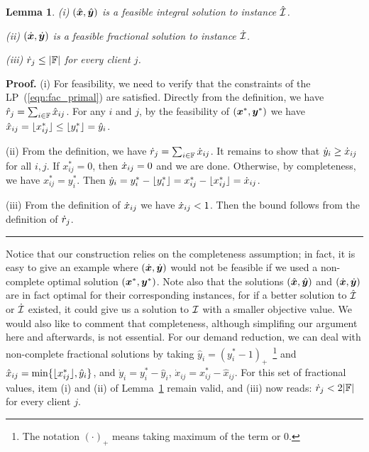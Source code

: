 \documentclass[oneside,final]{ucr}
\newtheorem{lemma}[theorem]{Lemma}
\newenvironment{proof}[1][Proof]{\textbf{#1.} }{\ \rule{0.5em}{0.5em}}
\begin{document}

\begin{lemma}\label{lem: polynomial demands partition}
{\rm (i)}
  $(\hat{\boldsymbol{x}}, \hat{\boldsymbol{y}})$ is a feasible integral solution to
  instance $\hatcalI$.

\noindent
{\rm (ii)}
  $(\dot{\boldsymbol{x}}, \dot{\boldsymbol{y}})$ is a feasible fractional
  solution to instance $\dotcalI$.

\noindent
{\rm (iii)}
${\dot r}_j\leq |\mathbb{F}|$ for every client $j$.

\end{lemma}
\begin{proof}
  (i) For feasibility, we need to verify that the
  constraints of the LP~(\ref{eqn:fac_primal}) are
  satisfied. Directly from the definition, we have ${\hat r}_j
  = \sum_{i\in\mathbb{F}} {\hat x}_{ij}$.  For any $i$ and $j$,
  by the feasibility of $(\boldsymbol{x}^\ast,\boldsymbol{y}^\ast)$ we have
  ${\hat x}_{ij} = { \lfloor x_{ij}^\ast \rfloor } \le { \lfloor y^\ast_i \rfloor } =
  {\hat y}_i$.

  (ii) From the definition, we have ${\dot r}_j =
  \sum_{i\in\mathbb{F}} {\dot x}_{ij}$.  It remains to show that
  ${\dot y}_i \geq {\dot x}_{ij}$ for all $i,j$.  If
  $x_{ij}^\ast=0$, then ${\dot x}_{ij}=0$ and we are done.
  Otherwise, by completeness, we have
  $x_{ij}^\ast=y_i^\ast$.  Then ${\dot y}_i = y_i^\ast -
  { \lfloor y_i^\ast \rfloor } = x_{ij}^\ast - { \lfloor x_{ij}^\ast \rfloor }
  ={\dot x}_{ij}$.

  (iii) From the definition of ${\dot x}_{ij}$ we have
  ${\dot x}_{ij} < 1$.  Then the bound follows from the
  definition of ${\dot r}_j$.
\end{proof}

Notice that our construction relies on the completeness
assumption; in fact, it is easy to give an example where
$(\dot{\boldsymbol{x}}, \dot{\boldsymbol{y}})$ would not be feasible if we used a
non-complete optimal solution $(\boldsymbol{x}^\ast,\boldsymbol{y}^\ast)$.  Note
also that the solutions $(\hat{\boldsymbol{x}},\hat{\boldsymbol{y}})$ and $(\dot{\boldsymbol{x}},
\dot{\boldsymbol{y}})$ are in fact optimal for their corresponding
instances, for if a better solution to $\hatcalI$ or
$\dotcalI$ existed, it could give us a solution to $\mathcal{I}$
with a smaller objective value. We would also like to
comment that completeness, although simplifing our argument
here and afterwards, is not essential. For our demand
reduction, we can deal with non-complete fractional
solutions by taking $\hat y_i = (y_i^\ast -
1)_+$~\footnote{The notation $(\cdot)_+$ means taking
  maximum of the term or 0.} and $\hat x_{ij} =
\min\{{ \lfloor x_{ij}^\ast \rfloor }, \hat y_i\}$, and $\dot y_i =
y_i^\ast - \hat y_i$, $\dot x_{ij} = x_{ij}^\ast - \hat
x_{ij}$. For this set of fractional values, item (i) and
(ii) of Lemma~\ref{lem: polynomial demands partition} remain
valid, and (iii) now reads: $\dot r_j < 2|\mathbb{F}|$ for
every client $j$.
\end{document}
